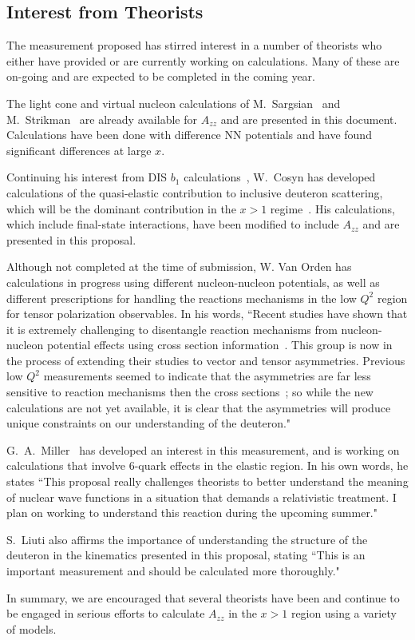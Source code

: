 \subsection{Interest from Theorists}

The measurement proposed has stirred interest in a number of theorists who either have provided or are currently working on calculations. Many of these are on-going and are expected to be completed in the coming year.

The light cone and virtual nucleon calculations of M.~Sargsian~\cite{misak-convo} and M.~Strikman~\cite{strikman-convo} are already available for $A_{zz}$ and are presented in this document. Calculations have been done with difference NN potentials and have found significant differences at large $x$.

Continuing his interest from DIS $b_1$ calculations~\cite{Cosyn:2014sqa}, W.~Cosyn has developed calculations of the quasi-elastic contribution to inclusive deuteron scattering, which will be the dominant contribution in the $x>1$ regime~\cite{cosyn-convo}. His calculations, which include final-state interactions, have been modified to include $A_{zz}$ and are presented in this proposal.

Although not completed at the time of submission, W. Van Orden has calculations in progress using different nucleon-nucleon potentials, as well as different prescriptions for handling the reactions mechanisms in the low $Q^2$ region for tensor polarization observables. In his words, ``Recent studies have shown that it is extremely challenging to disentangle reaction mechanisms from nucleon-nucleon potential effects using cross section information~\cite{Ford:2014yua}. This group is now in the process of extending their studies to vector and tensor asymmetries. Previous low $Q^2$ measurements seemed to indicate that the asymmetries are far less sensitive to reaction 
mechanisms then the cross sections~\cite{Passchier:2001uc}; so while the 
new calculations are not yet available, it is clear that the asymmetries will produce unique constraints 
on our understanding of the deuteron."~\cite{vanorden-convo}

G.~A.~Miller~\cite{miller-convo} has developed an interest in this measurement, and is working on calculations that involve 6-quark effects in the elastic region. In his own words, he states ``This proposal really challenges theorists to better understand the meaning of nuclear wave functions in a situation that demands a relativistic treatment. I plan on working to understand this reaction during the upcoming summer."

S.~Liuti also affirms the importance of understanding the structure of the deuteron in the kinematics presented in this proposal, stating ``This is an important measurement and should be calculated more thoroughly."~\cite{liuti-convo}



In summary, we are encouraged that several theorists have been and continue to be engaged in serious efforts to calculate $A_{zz}$ in the $x>1$ region using a variety of models.